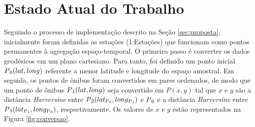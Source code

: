 \documentclass[12pt]{report} %
\begin{document}
\chapter{Estado Atual do Trabalho}
\label{sec:estado_atual}

Seguindo o processo de implementação descrito na Seção \ref{sec:proposta}, inicialmente foram definidas as estações (1:Estações) que funcionam como pontos permanentes à agregação espaço-temporal. O primeiro passo é converter os dados geodésicos em um plano cartesiano. Para tanto, foi definido um ponto inicial $P\textsubscript{0}(lat, long)$ referente a menor latitude e longitude do espaço amostral. Em seguida, os pontos de ônibus foram convertidos em pares ordenados, de modo que um ponto de ônibus $P\textsubscript{1}(lat,long)$ seja convertido em $P(x,y)$ tal que $x$ e $y$ são a distância \emph{Harversine} entre $P\textsubscript{2}(lat\textsubscript{P\textsubscript{0}},long\textsubscript{P\textsubscript{1}})$ e $P\textsubscript{0}$ e a distância \emph{Harversine} entre $P\textsubscript{3}(lat\textsubscript{P\textsubscript{1}},long\textsubscript{P\textsubscript{0}})$, respectivamente. Os valores de $x$ e $y$ estão representados na Figura \ref{fig:conversao}.
\end{document}
